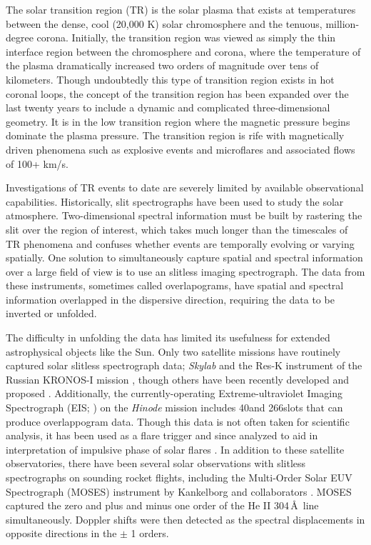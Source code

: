     The solar transition region (TR) is the solar plasma that exists at temperatures between the
    dense, cool (20,000 K) solar chromosphere and the tenuous, million-degree corona. 
    Initially, the transition region was viewed as simply the thin interface region between the chromosphere and corona, where the temperature of the plasma dramatically increased two orders of magnitude over tens of kilometers. 
    Though undoubtedly this type of transition region exists in hot coronal loops, the concept of the transition region has been expanded over the last twenty years to include a dynamic and complicated three-dimensional geometry. 
    It is in the low transition region where the magnetic pressure begins dominate the plasma pressure. The transition region is rife with magnetically driven phenomena such as explosive events \cite[e.g.,][]{dere1991} and microflares \citep{gontikakis2012} and associated flows of 100+ km/s.  
    
    Investigations of TR events to date are severely limited by available observational capabilities. 
    Historically, slit spectrographs have been used to study the solar atmosphere.   
    Two-dimensional spectral information must be built by rastering the slit over the region of interest, which takes much longer than the timescales of TR phenomena and confuses whether events are temporally evolving or varying spatially.  
    One solution to simultaneously capture spatial and spectral information over a large field of view is to use an slitless imaging spectrograph.  
    The data from these instruments, sometimes called overlapograms, have spatial and spectral information overlapped in the dispersive direction, requiring the data to be inverted or unfolded.  
    
    The difficulty in unfolding the data has limited its usefulness for extended astrophysical objects like the Sun. 
    Only two satellite missions have routinely captured solar slitless spectrograph data; {\it Skylab} \citep{Tousey1973} and the Res-K instrument of the Russian KRONOS-I mission \citep{Zhitnik1998}, though others have been recently developed and proposed \citep{winebarger2019,golub2020}. Additionally, the currently-operating Extreme-ultraviolet Imaging Spectrograph (EIS; \citet{culhane2007}) on the {\it Hinode} mission \citep{kosugi2007} includes 40\arcsec and 266\arcsec slots that can produce overlappogram data.  Though this data is not often taken for scientific analysis, it has been used as a flare trigger and since analyzed to aid in interpretation of impulsive phase of solar flares \citep{harra2017,harra2020}.
    In addition to these satellite observatories, there have been several solar observations with slitless spectrographs on sounding rocket flights, including the Multi-Order Solar EUV Spectrograph (MOSES) instrument by Kankelborg and collaborators \citep{Kankelborg01,Fox10}.
     MOSES captured the zero and plus and minus one order of the He II 304\,\AA\ line simultaneously. Doppler shifts were then detected as the spectral displacements in opposite directions in the $\pm$ 1 orders.
    
